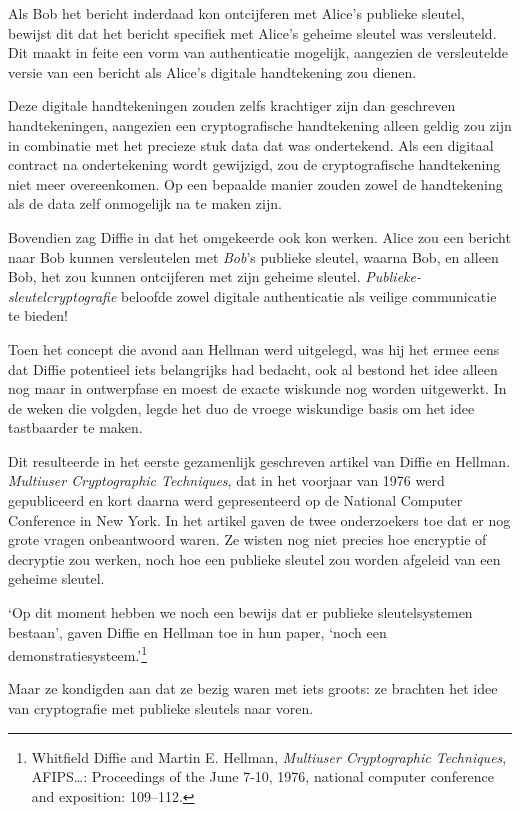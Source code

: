 \documentclass[
  a5paper,
  smalldemyvopaper,11pt,twoside,onecolumn,openright,extrafontsizes,
hidelinks]{memoir}
\begin{document}
Als Bob het bericht inderdaad kon ontcijferen met Alice's publieke
sleutel, bewijst dit dat het bericht specifiek met Alice's geheime
sleutel was versleuteld. Dit maakt in feite een vorm van authenticatie
mogelijk, aangezien de versleutelde versie van een bericht als Alice's
digitale handtekening zou dienen.

Deze digitale handtekeningen zouden zelfs krachtiger zijn dan geschreven
handtekeningen, aangezien een cryptografische handtekening alleen geldig
zou zijn in combinatie met het precieze stuk data dat was ondertekend.
Als een digitaal contract na ondertekening wordt gewijzigd, zou de
cryptografische handtekening niet meer overeenkomen. Op een bepaalde
manier zouden zowel de handtekening als de data zelf onmogelijk na te
maken zijn.

Bovendien zag Diffie in dat het omgekeerde ook kon werken. Alice zou een
bericht naar Bob kunnen versleutelen met \emph{Bob}'s publieke sleutel,
waarna Bob, en alleen Bob, het zou kunnen ontcijferen met zijn geheime
sleutel. \emph{Publieke-sleutelcryptografie} beloofde zowel digitale
authenticatie als veilige communicatie te bieden!

Toen het concept die avond aan Hellman werd uitgelegd, was hij het ermee
eens dat Diffie potentieel iets belangrijks had bedacht, ook al bestond
het idee alleen nog maar in ontwerpfase en moest de exacte wiskunde nog
worden uitgewerkt. In de weken die volgden, legde het duo de vroege
wiskundige basis om het idee tastbaarder te maken.

Dit resulteerde in het eerste gezamenlijk geschreven artikel van Diffie
en Hellman. \emph{Multiuser Cryptographic Techniques}, dat in het
voorjaar van 1976 werd gepubliceerd en kort daarna werd gepresenteerd op
de National Computer Conference in New York. In het artikel gaven de
twee onderzoekers toe dat er nog grote vragen onbeantwoord waren. Ze
wisten nog niet precies hoe encryptie of decryptie zou werken, noch hoe
een publieke sleutel zou worden afgeleid van een geheime sleutel.

`Op dit moment hebben we noch een bewijs dat er publieke sleutelsystemen
bestaan', gaven Diffie en Hellman toe in hun paper, `noch een
demonstratiesysteem.'\footnote{Whitfield Diffie and Martin E. Hellman,
  \emph{Multiuser Cryptographic Techniques}, AFIPS\ldots: Proceedings of
  the June 7-10, 1976, national computer conference and exposition:
  109--112.}

Maar ze kondigden aan dat ze bezig waren met iets groots: ze brachten
het idee van cryptografie met publieke sleutels naar voren.
\end{document}
